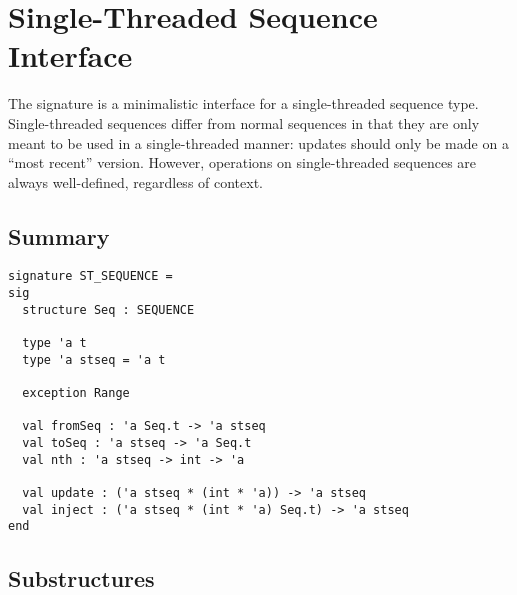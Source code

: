 \chapter{Single-Threaded Sequence Interface}
\label{ch:st-seq-interface}

\begin{cluster}
\label{grp:grm:st-seq-interface::sequence}

\begin{gram}
\label{grm:st-seq-interface::sequence}
\label{ch:st-seq-interface}
\begin{preamble}
The  signature is a minimalistic interface for a
single-threaded sequence type. Single-threaded sequences differ from normal
sequences in that they are only meant to be used in a single-threaded
manner: updates should only be made on a ``most recent'' version. However,
operations on single-threaded sequences are always well-defined, regardless of
context.
\end{preamble}

\end{gram}
\end{cluster}


\section{Summary}
\label{sec:st-seq-interface::summary}

\begin{cluster}
\label{grp:grm:st-seq-interface::signature}

\begin{gram}
\label{grm:st-seq-interface::signature}
\begin{verbatim}
signature ST_SEQUENCE =
sig
  structure Seq : SEQUENCE

  type 'a t
  type 'a stseq = 'a t

  exception Range

  val fromSeq : 'a Seq.t -> 'a stseq
  val toSeq : 'a stseq -> 'a Seq.t
  val nth : 'a stseq -> int -> 'a

  val update : ('a stseq * (int * 'a)) -> 'a stseq
  val inject : ('a stseq * (int * 'a) Seq.t) -> 'a stseq
end
\end{verbatim}

\end{gram}
\end{cluster}


\section{Substructures}
\label{sec:st-seq-interface::substructures}

